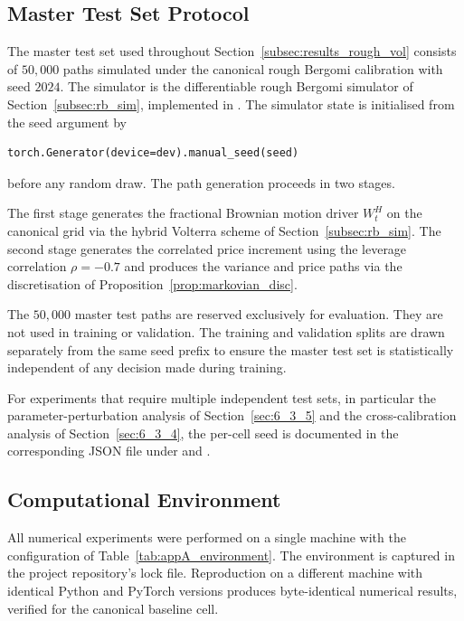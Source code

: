 \documentclass[12pt,a4paper]{article}
\theoremstyle{definition}
\theoremstyle{plain}
\theoremstyle{remark}
\theoremstyle{plain}
\begin{document}
\subsection{Master Test Set Protocol}
\label{app:master_test_set}

The master test set used throughout Section~\ref{subsec:results_rough_vol}
consists of $50{,}000$ paths simulated under the canonical rough
Bergomi calibration with seed $2024$. The simulator is the
differentiable rough Bergomi simulator of Section~\ref{subsec:rb_sim},
implemented in . The simulator
state is initialised from the seed argument by
\begin{verbatim}
torch.Generator(device=dev).manual_seed(seed)
\end{verbatim}
before any random draw. The path generation proceeds in two stages.

The first stage generates the fractional Brownian motion driver
$W^H_t$ on the canonical grid via the hybrid Volterra scheme of
Section~\ref{subsec:rb_sim}. The second stage generates the correlated
price increment using the leverage correlation $\rho = -0.7$ and
produces the variance and price paths via the discretisation of
Proposition~\ref{prop:markovian_disc}.

The $50{,}000$ master test paths are reserved exclusively for
evaluation. They are not used in training or validation. The training
and validation splits are drawn separately from the same seed prefix to
ensure the master test set is statistically independent of any decision
made during training.

For experiments that require multiple independent test sets, in
particular the parameter-perturbation analysis of
Section~\ref{sec:6_3_5} and the cross-calibration analysis of
Section~\ref{sec:6_3_4}, the per-cell seed is documented in the
corresponding JSON file under  and
.

\subsection{Computational Environment}
\label{app:computational_environment}

All numerical experiments were performed on a single machine with the
configuration of Table~\ref{tab:appA_environment}. The environment is
captured in the project repository's lock file. Reproduction on a
different machine with identical Python and PyTorch versions produces
byte-identical numerical results, verified for the canonical baseline
cell.
\end{document}
